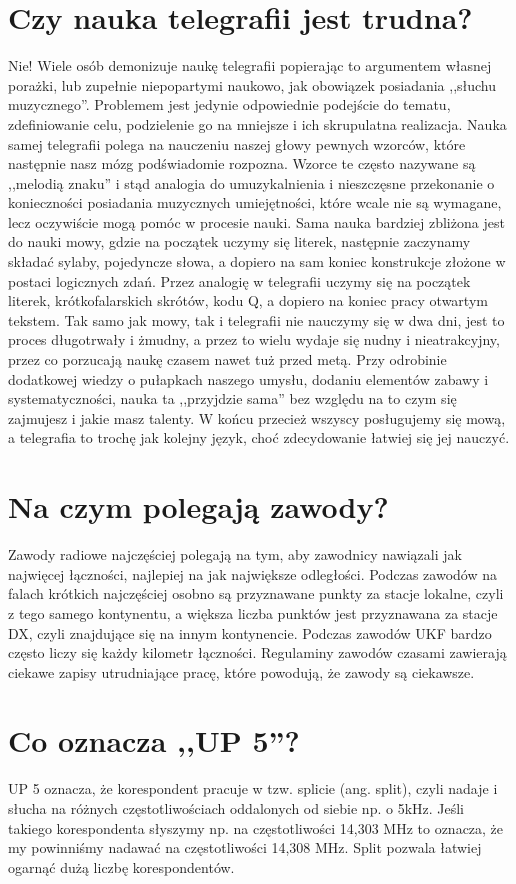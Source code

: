 \documentclass[a4paper,12pt]{article}
\begin{document}
\section{Czy nauka telegrafii jest trudna?}
Nie! Wiele osób demonizuje naukę telegrafii popierając to argumentem własnej porażki, lub zupełnie niepopartymi naukowo, jak obowiązek posiadania ,,słuchu muzycznego''. Problemem jest jedynie odpowiednie podejście do tematu, zdefiniowanie celu, podzielenie go na mniejsze i ich skrupulatna realizacja. Nauka samej telegrafii polega na nauczeniu naszej głowy pewnych wzorców, które następnie nasz mózg podświadomie rozpozna. Wzorce te często nazywane są ,,melodią znaku'' i stąd analogia do umuzykalnienia i nieszczęsne przekonanie o konieczności posiadania muzycznych umiejętności, które wcale nie są wymagane, lecz oczywiście mogą pomóc w procesie nauki. Sama nauka bardziej zbliżona jest do nauki mowy, gdzie na początek uczymy się literek, następnie zaczynamy składać sylaby, pojedyncze słowa, a dopiero na sam koniec konstrukcje złożone w postaci logicznych zdań. Przez analogię w telegrafii uczymy się na początek literek, krótkofalarskich skrótów, kodu Q, a dopiero na koniec pracy otwartym tekstem. Tak samo jak mowy, tak i telegrafii nie nauczymy się w dwa dni, jest to proces długotrwały i żmudny, a przez to wielu wydaje się nudny i nieatrakcyjny, przez co porzucają naukę czasem nawet tuż przed metą. Przy odrobinie dodatkowej wiedzy o pułapkach naszego umysłu, dodaniu elementów zabawy i systematyczności, nauka ta ,,przyjdzie sama'' bez względu na to czym się zajmujesz i jakie masz talenty. W końcu przecież wszyscy posługujemy się mową, a telegrafia to trochę jak kolejny język, choć zdecydowanie łatwiej się jej nauczyć. 

\section{Na czym polegają zawody?}
Zawody radiowe najczęściej polegają na tym, aby zawodnicy nawiązali jak najwięcej łączności, najlepiej na jak największe odległości. Podczas zawodów na falach krótkich najczęściej osobno są przyznawane punkty za stacje lokalne, czyli z tego samego kontynentu, a większa liczba punktów jest przyznawana za stacje DX, czyli znajdujące się na innym kontynencie. Podczas zawodów UKF bardzo często liczy się każdy kilometr łączności. Regulaminy zawodów czasami zawierają ciekawe zapisy utrudniające pracę, które powodują, że zawody są ciekawsze.

\section{Co oznacza ,,UP 5''?}
UP 5 oznacza, że korespondent pracuje w tzw. splicie (ang. split), czyli nadaje i słucha na różnych częstotliwościach oddalonych od siebie np. o 5kHz. Jeśli takiego korespondenta słyszymy np. na częstotliwości 14,303 MHz to oznacza, że my powinniśmy nadawać na częstotliwości 14,308 MHz. Split pozwala łatwiej ogarnąć dużą liczbę korespondentów. 
\end{document}
